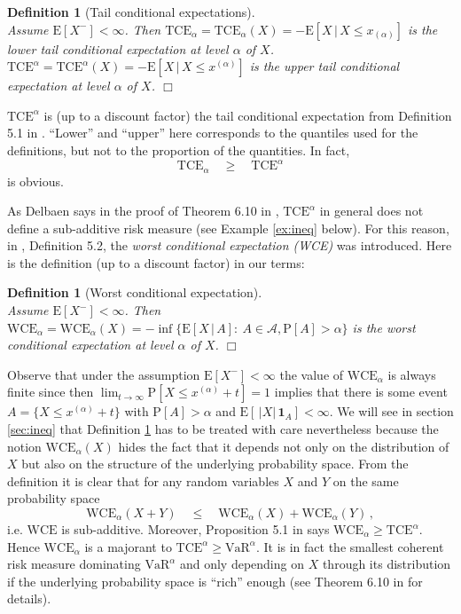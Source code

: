 \documentclass[11pt,a4paper,leqno]{article}
\newtheorem{definition}[theorem]{Definition}
\begin{document}
\begin{definition}[Tail conditional expectations]\ \\
\label{def:3}
Assume $\mathrm{E}[X^-] < \infty$. Then
$\mathrm{TCE}_\alpha = \mathrm{TCE}_\alpha(X) = - \mathrm{E}[ X\,|\, X \le  x_{(\alpha)}]$ is the
\emph{lower tail conditional expectation} at level $\alpha$ of $X$.\\
$\mathrm{TCE}^\alpha = \mathrm{TCE}^\alpha(X) = - \mathrm{E}[ X\,|\, X \le  x^{(\alpha)}]$ is the
\emph{upper tail conditional expectation} at level $\alpha$ of $X$. \hfill $\Box$
\end{definition}

$\mathrm{TCE}^\alpha$ is (up to a discount factor) the tail conditional expectation from Definition 5.1
in \cite{ADEH99}. ``Lower'' and ``upper'' here corresponds to the quantiles used for the definitions,
but not to the proportion of the quantities. In fact,
\begin{equation}
\mathrm{TCE}_\alpha\quad \ge\quad \mathrm{TCE}^\alpha
  \label{eq:bd3}
\end{equation}
is obvious.

As Delbaen says in the proof of Theorem 6.10 in \cite{Delb98}, $\mathrm{TCE}^\alpha$ in general does
not define a sub-additive risk measure (see Example \ref{ex:ineq} below). For this
reason, in \cite{ADEH99}, Definition 5.2, the \emph{worst conditional expectation (WCE)} was introduced. Here
is the definition (up to a discount factor) in our terms:

\begin{definition}[Worst conditional expectation]
\label{def:4}\ \\
Assume $\mathrm{E}[X^-] < \infty$. Then
$\mathrm{WCE}_\alpha = \mathrm{WCE}_\alpha(X) = - \inf\{ \mathrm{E}[X\,|\,A]:\ A \in \mathcal{A}, 
\mathrm{P}[A] > \alpha\}$ is the \emph{worst conditional expectation} at level $\alpha$ of $X$.
\hfill $\Box$
\end{definition}

Observe that under the assumption $\mathrm{E}[X^-] < \infty$ the value of $\mathrm{WCE}_\alpha$ is always
finite since then $\lim_{t\to\infty} \mathrm{P}[X\le x^{(\alpha)}+t]=1$ implies that there is some
event $A = \{X\le x^{(\alpha)}+t\}$ with $\mathrm{P}[A] > \alpha$ and $\mathrm{E}[\,|X|\,\mathbf{1}_A] < \infty$.
We will see in section \ref{sec:ineq} that Definition \ref{def:4} has to be
treated with care nevertheless because the notion $\mathrm{WCE}_\alpha(X)$ hides the fact
that it depends not only on the distribution of $X$ but also on the structure
of
the underlying probability space.
From the definition it is clear that for any random variables $X$ and $Y$ on the same probability
space
$$
\mathrm{WCE}_\alpha(X + Y) \quad \le \quad \mathrm{WCE}_\alpha(X) + \mathrm{WCE}_\alpha(Y)\,,
$$
i.e. $\mathrm{WCE}$ is sub-additive. Moreover, Proposition 5.1 in \cite{ADEH99} says
$\mathrm{WCE}_\alpha \ge \mathrm{TCE}^\alpha$. Hence $\mathrm{WCE}_\alpha$ is a majorant
to $\mathrm{TCE}^\alpha \ge \mathrm{VaR}^\alpha$. It is in fact the smallest coherent
risk measure dominating $\mathrm{VaR}^\alpha$ and only depending on $X$ through its
distribution if the underlying probability space is ``rich'' enough 
(see Theorem 6.10 in \cite{Delb98} for details). 
\end{document}
